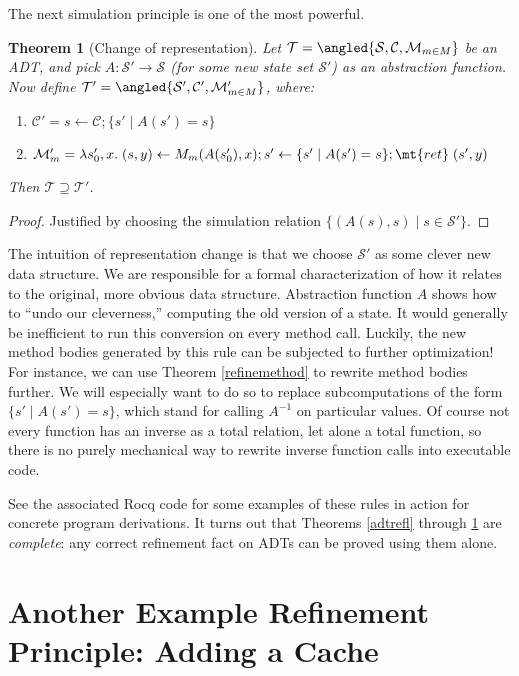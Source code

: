 \documentclass{amsbook}
\newtheorem{theorem}{Theorem}[chapter]
\theoremstyle{definition}
\theoremstyle{remark}
\numberwithin{section}{chapter}
\numberwithin{equation}{chapter}
\begin{document}
The next simulation principle is one of the most powerful.

\begin{theorem}[Change of representation]\label{repchange}
  Let $\mathcal T = \angled{\mathcal S, \mathcal C, \mathcal M_{m \in M}}$ be an ADT, and pick $A : \mathcal S' \to \mathcal S$ (for some new state set $\mathcal S'$) as an \emph{abstraction function}.
  Now define $\mathcal T' = \angled{\mathcal S', \mathcal C', \mathcal M'_{m \in M}}$, where:
  \begin{enumerate}
  \item $\mathcal C' = s \leftarrow \mathcal C; \{s' \mid A(s') = s\}$
  \item $\mathcal M'_m = \lambda s'_0, x. \; \mathcal (s, y) \leftarrow M_m(A(s'_0), x); s' \leftarrow \{s' \mid A(s') = s\}; \mt{ret} \; (s', y)$
  \end{enumerate}
  Then $\mathcal T \supseteq \mathcal T'$.
\end{theorem}
\begin{proof}
  Justified by choosing the simulation relation $\{(A(s), s) \mid s \in \mathcal S'\}$.
\end{proof}

The intuition of representation change is that we choose $\mathcal S'$ as some clever new data structure.
We are responsible for a formal characterization of how it relates to the original, more obvious data structure.
Abstraction function $A$ shows how to ``undo our cleverness,'' computing the old version of a state.
It would generally be inefficient to run this conversion on every method call.
Luckily, the new method bodies generated by this rule can be subjected to further optimization!
For instance, we can use Theorem \ref{refinemethod} to rewrite method bodies further.
We will especially want to do so to replace subcomputations of the form $\{s' \mid A(s') = s\}$, which stand for calling $A^{-1}$ on particular values.
Of course not every function has an inverse as a total relation, let alone a total function, so there is no purely mechanical way to rewrite inverse function calls into executable code.

See the associated Rocq code for some examples of these rules in action for concrete program derivations.
It turns out that Theorems \ref{adtrefl} through \ref{repchange} are \emph{complete}: any correct refinement fact on ADTs can be proved using them alone.

\section{Another Example Refinement Principle: Adding a Cache}
\end{document}
